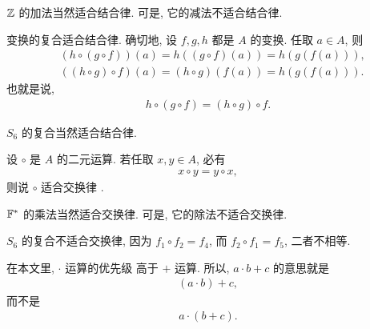 \begin{example}
    $\mathbb{Z}$ 的加法当然适合结合律. 可是, 它的减法不适合结合律.
\end{example}

\begin{remark}
    变换的复合适合结合律. 确切地, 设 $f,g,h$ 都是 $A$ 的变换. 任取 $a \in A$, 则
    \begin{align*}
         & (h \circ (g \circ f))(a) = h((g \circ f)(a)) = h(g(f(a))), \\
         & ((h \circ g) \circ f)(a) = (h \circ g)(f(a)) = h(g(f(a))).
    \end{align*}
    也就是说,
    \begin{align*}
        h \circ (g \circ f) = (h \circ g) \circ f.
    \end{align*}
\end{remark}

\begin{example}
    $S_6$ 的复合当然适合结合律.
\end{example}

\begin{definition}
    设 $\circ$ 是 $A$ 的二元运算. 若任取 $x,y \in A$, 必有
    \begin{align*}
        x \circ y = y \circ x,
    \end{align*}
    则说 $\circ$ 适合交换律 .
\end{definition}

\begin{example}
    $\mathbb{F}^{\ast}$ 的乘法当然适合交换律. 可是, 它的除法不适合交换律.
\end{example}

\begin{example}
    $S_6$ 的复合不适合交换律, 因为 $f_1 \circ f_2 = f_4$, 而 $f_2 \circ f_1 = f_5$, 二者不相等.
\end{example}

\begin{remark}
    在本文里, $\cdot$ 运算的优先级  高于 $+$ 运算. 所以, $a \cdot b + c$ 的意思就是
    \begin{align*}
        (a \cdot b) + c,
    \end{align*}
    而不是
    \begin{align*}
        a \cdot (b + c).
    \end{align*}
\end{remark}

